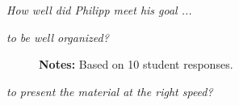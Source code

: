 \begin{boenumerate}
\item \textit{How well did Philipp meet his goal ...}
\begin{itemize}
\item \textit{to be well organized?}

\begin{figure}[h!]\centering
{}\hspace{0.75cm}
\begin{center}
\begin{minipage}[t]{0.85\columnwidth}\vspace{-0.75cm}
\item\scriptsize{\textbf{Notes:} Based on 10 student responses. }
\end{minipage}
\end{center}
\end{figure}

\item \textit{to present the material at the right speed?}


\end{itemize}
\end{boenumerate}
